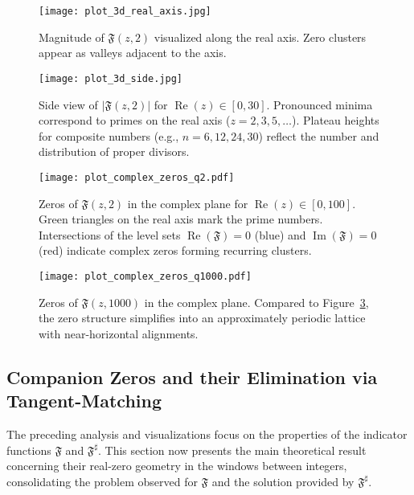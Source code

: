 \documentclass[11pt,a4paper]{amsart}
\DeclareMathOperator{\re}{Re}
\newcommand{\Fbase}{\mathfrak F}
\newcommand{\Fsharp}{\Fbase^{\sharp}}
\theoremstyle{plain}
\theoremstyle{definition}
\theoremstyle{remark}
\begin{document}
\begin{figure}[!htbp]
\centering
\texttt{[image: plot\_3d\_real\_axis.jpg]}
\caption{Magnitude of $\mathfrak{F}(z,2)$ visualized along the real axis. Zero clusters appear as valleys adjacent to the axis.}
\label{fig:3d_real_axis}
\end{figure}

\begin{figure}[!htbp]
\centering
\texttt{[image: plot\_3d\_side.jpg]}
\caption{Side view of $\lvert \mathfrak{F}(z,2)\rvert$ for $\re(z) \in [0, 30]$. Pronounced minima correspond to primes on the real axis ($z=2,3,5,\dots$). Plateau heights for composite numbers (e.g., $n=6,12,24,30$) reflect the number and distribution of proper divisors.}
\label{fig:3d_side_view}
\end{figure}

\begin{figure}[!htbp]
\centering
\texttt{[image: plot\_complex\_zeros\_q2.pdf]}
\caption{Zeros of $\mathfrak{F}(z,2)$ in the complex plane for $\re(z) \in [0, 100]$. Green triangles on the real axis mark the prime numbers. Intersections of the level sets $\operatorname{Re}(\mathfrak{F})=0$ (blue) and $\operatorname{Im}(\mathfrak{F})=0$ (red) indicate complex zeros forming recurring clusters.}
\label{fig:complex_zeros_low_q}
\end{figure}

\begin{figure}[!htbp]
\centering
\texttt{[image: plot\_complex\_zeros\_q1000.pdf]}
\caption{Zeros of $\mathfrak{F}(z,1000)$ in the complex plane. Compared to Figure~\ref{fig:complex_zeros_low_q}, the zero structure simplifies into an approximately periodic lattice with near-horizontal alignments.}
\label{fig:complex_zeros_high_q}
\end{figure}

\FloatBarrier



\subsection{Companion Zeros and their Elimination via Tangent-Matching}
The preceding analysis and visualizations focus on the properties of the indicator functions $\mathfrak{F}$ and $\Fsharp$. This section now presents the main theoretical result concerning their real-zero geometry in the windows between integers, consolidating the problem observed for $\mathfrak{F}$ and the solution provided by $\Fsharp$.
\end{document}
